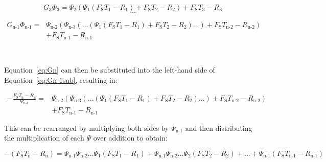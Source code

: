\documentclass[12pt]{article}
\begin{document}
\begin{equation} \label{eq:G3sub}
G_\text{3} \Phi_\text{3} = \Psi_\text{2} \left( \Psi_\text{1} \left(F_\text{S} 
T_\text{1} - R_\text{1} 
\right) + F_\text{S} T_\text{2} - R_\text{2} \right) + F_\text{S} 
T_\text{3} - R_\text{3}
\end{equation}
\begin{equation*}
\dots
\end{equation*}

\begin{equation} \label{eq:Gn-1sub}
\begin{split}
G_\text{n-1} \Phi_\text{n-1} = & \Psi_\text{n-2} \left(
\Psi_\text{n-3} \left( 
\dots \left( \Psi_\text{1} \left(F_\text{S} 
T_\text{1} - R_\text{1} 
\right) + F_\text{S} T_\text{2} - R_\text{2} \right) \dots \right) + F_\text{S} 
T_\text{n-2} - R_\text{n-2} \right) \\& + F_\text{S} 
T_\text{n-1} - R_\text{n-1} 
\end{split}
\end{equation}

~\newline

\noindent Equation~\ref{eq:Gn} can then be substituted into the left-hand side 
of Equation~\ref{eq:Gn-1sub}, resulting in:

\begin{equation*}
\begin{split}
- \frac{F_\text{S} T_\text{n} - R_\text{n}}{\Psi_\text{n-1} } = & 
\Psi_\text{n-2} 
\left(
\Psi_\text{n-3} \left( 
\dots \left( \Psi_\text{1} \left(F_\text{S} 
T_\text{1} - R_\text{1} 
\right) + F_\text{S} T_\text{2} - R_\text{2} \right) \dots \right) + F_\text{S} 
T_\text{n-2} - R_\text{n-2} \right) \\& + F_\text{S} 
T_\text{n-1} - R_\text{n-1} 
\end{split}
\end{equation*}

\noindent This can be rearranged by multiplying both sides by $\Psi_\text{n-1}$ 
and then distributing the multiplication of each $\Psi$ over addition to obtain:

\begin{equation*}
- \left( F_\text{S} T_\text{n} - R_\text{n} \right) = \Psi_\text{n-1} 
\Psi_\text{n-2} 
\dots \Psi_\text{1} \left( F_\text{S} T_\text{1} - R_\text{1} \right) + 
\Psi_\text{n-1} \Psi_\text{n-2} \dots \Psi_\text{2} \left( F_\text{S} 
T_\text{2} - R_\text{2} \right) + \dots + \Psi_\text{n-1} \left( F_\text{S} 
T_\text{n-1} - R_\text{n-1} \right)
\end{equation*}
\end{document}
